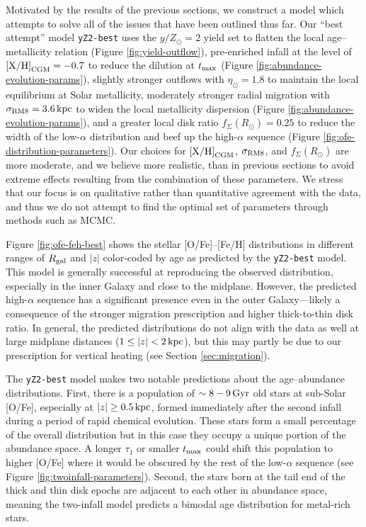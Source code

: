 \documentclass[twocolumn,twocolappendix,linenumbers]{aastex631}
\newcommand{\mathXH}{{\rm [X/H]}}
\newcommand{\yZ}[1]{$y/Z_\odot=#1$}
\newcommand{\kpc}{\,{\rm kpc}}
\newcommand{\Gyr}{\,{\rm Gyr}}
\begin{document}
Motivated by the results of the previous sections, we construct a model which attempts to solve all of the issues that have been outlined thus far. Our ``best attempt'' model {\tt yZ2-best} uses the \yZ{2} yield set to flatten the local age--metallicity relation (Figure \ref{fig:yield-outflow}), pre-enriched infall at the level of $\mathXH_{\rm CGM}=-0.7$ to reduce the dilution at $t_{\rm max}$ (Figure \ref{fig:abundance-evolution-params}), slightly stronger outflows with $\eta_\odot=1.8$ to maintain the local equilibrium at Solar metallicity, moderately stronger radial migration with $\sigma_{\rm RM8}=3.6\kpc$ to widen the local metallicity dispersion (Figure \ref{fig:abundance-evolution-params}), and a greater local disk ratio $f_\Sigma(R_\odot)=0.25$ to reduce the width of the low-$\alpha$ distribution and beef up the high-$\alpha$ sequence (Figure \ref{fig:ofe-distribution-parameters}). Our choices for $\mathXH_{\rm CGM}$, $\sigma_{\rm RM8}$, and $f_\Sigma(R_\odot)$ are more moderate, and we believe more realistic, than in previous sections to avoid extreme effects resulting from the combination of these parameters. We stress that our focus is on qualitative rather than quantitative agreement with the data, and thus we do not attempt to find the optimal set of parameters through methods such as MCMC.

Figure \ref{fig:ofe-feh-best} shows the stellar [O/Fe]--[Fe/H] distributions in different ranges of $R_{\rm gal}$ and $|z|$ color-coded by age as predicted by the {\tt yZ2-best} model. This model is generally successful at reproducing the observed distribution, especially in the inner Galaxy and close to the midplane. However, the predicted high-$\alpha$ sequence has a significant presence even in the outer Galaxy---likely a consequence of the stronger migration prescription and higher thick-to-thin disk ratio. In general, the predicted distributions do not align with the data as well at large midplane distances ($1\leq|z|<2\kpc$), but this may partly be due to our prescription for vertical heating (see Section \ref{sec:migration}).

The {\tt yZ2-best} model makes two notable predictions about the age--abundance distributions. First, there is a population of $\sim8-9\Gyr$ old stars at sub-Solar [O/Fe], especially at $|z|\ge0.5\kpc$, formed immediately after the second infall during a period of rapid chemical evolution. These stars form a small percentage of the overall distribution \citep[see also Figure 11 from][]{spitoni_remind_2024} but in this case they occupy a unique portion of the abundance space. A longer $\tau_1$ or smaller $t_{\rm max}$ could shift this population to higher [O/Fe] where it would be obscured by the rest of the low-$\alpha$ sequence (see Figure \ref{fig:twoinfall-parameters}). Second, the stars born at the tail end of the thick and thin disk epochs are adjacent to each other in abundance space, meaning the two-infall model predicts a bimodal age distribution for metal-rich stars.
\end{document}

